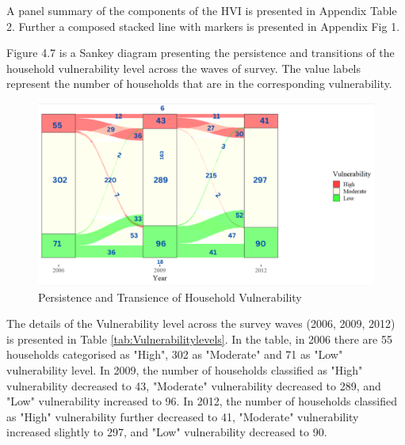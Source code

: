 A panel summary of the components of the HVI is presented in Appendix Table 2. Further a composed stacked line with markers is presented in Appendix Fig 1.

Figure 4.7 is a Sankey diagram presenting the persistence and transitions of the household vulnerability level across the waves of survey. The value labels represent the number of households that are in the corresponding vulnerability. \\

\begin{figure}[htb]
	\includegraphics[scale=0.6]{./figure/Sankey}
	\caption{Persistence and Transience of Household Vulnerability}
	\setlength{\abovecaptionskip}{2pt}
	\label{fig:sankey}
\end{figure}

The details of the Vulnerability level across the survey waves (2006, 2009, 2012) is presented in Table \ref{tab:Vulnerabilitylevels}. In the table, in 2006 there are 55 households categorised as "High", 302 as "Moderate" and 71 as "Low" vulnerability level. In 2009, the number of households classified as "High" vulnerability decreased to 43, "Moderate" vulnerability decreased to 289, and "Low" vulnerability increased to 96.
In 2012, the number of households classified as "High" vulnerability further decreased to 41, "Moderate" vulnerability increased slightly to 297, and "Low" vulnerability decreased to 90.

